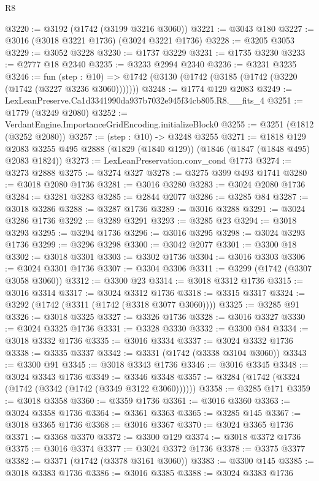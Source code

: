 \begin{lexlean}{R8}
\begin{coremodule}
@3220 := @3192 (@1742 (@3199 @3216 @3060))
@3221 := @3043 @180
@3227 := @3016 (@3018 @3221 @1736) (@3024 @3221 @1736)
@3228 := @3205 @3053
@3229 := @3052 @3228
@3230 := @1737 @3229
@3231 := @1735 @3230
@3233 := @2777 @18 @2340
@3235 := @3233 @2994 @2340
@3236 := @3231 @3235
@3246 := fun (step : @10) =>
  @1742 (@3130 (@1742 (@3185 (@1742 (@3220 (@1742 (@3227 @3236 @3060)))))))
@3248 := @1774 @129 @2083
@3249 := LexLeanPreserve.Ca1d3341990da937b7032e945f34cb805.R8.__fits_4
@3251 := @1779 (@3249 @2080)
@3252 := VerdantEngine.ImportanceGridEncoding.initializeBlock0
@3255 := @3251 (@1812 (@3252 @2080))
@3257 := (step : @10) -> @3248 @3255
@3271 := @1818
    @129
    @2083
    @3255
    @495
    @2888
    (@1829 (@1840 @129))
    (@1846 (@1847 (@1848 @495) @2083 @1824))
@3273 := LexLeanPreservation.conv_cond @1773
@3274 := @3273 @2888
@3275 := @3274 @327
@3278 := @3275 @399 @493 @1741
@3280 := @3018 @2080 @1736
@3281 := @3016 @3280
@3283 := @3024 @2080 @1736
@3284 := @3281 @3283
@3285 := @2844 @2077
@3286 := @3285 @84
@3287 := @3018 @3286
@3288 := @3287 @1736
@3289 := @3016 @3288
@3291 := @3024 @3286 @1736
@3292 := @3289 @3291
@3293 := @3285 @23
@3294 := @3018 @3293
@3295 := @3294 @1736
@3296 := @3016 @3295
@3298 := @3024 @3293 @1736
@3299 := @3296 @3298
@3300 := @3042 @2077
@3301 := @3300 @18
@3302 := @3018 @3301
@3303 := @3302 @1736
@3304 := @3016 @3303
@3306 := @3024 @3301 @1736
@3307 := @3304 @3306
@3311 := @3299 (@1742 (@3307 @3058 @3060))
@3312 := @3300 @23
@3314 := @3018 @3312 @1736
@3315 := @3016 @3314
@3317 := @3024 @3312 @1736
@3318 := @3315 @3317
@3324 := @3292 (@1742 (@3311 (@1742 (@3318 @3077 @3060))))
@3325 := @3285 @91
@3326 := @3018 @3325
@3327 := @3326 @1736
@3328 := @3016 @3327
@3330 := @3024 @3325 @1736
@3331 := @3328 @3330
@3332 := @3300 @84
@3334 := @3018 @3332 @1736
@3335 := @3016 @3334
@3337 := @3024 @3332 @1736
@3338 := @3335 @3337
@3342 := @3331 (@1742 (@3338 @3104 @3060))
@3343 := @3300 @91
@3345 := @3018 @3343 @1736
@3346 := @3016 @3345
@3348 := @3024 @3343 @1736
@3349 := @3346 @3348
@3357 := @3284 (@1742 (@3324 (@1742 (@3342 (@1742 (@3349 @3122 @3060))))))
@3358 := @3285 @171
@3359 := @3018 @3358
@3360 := @3359 @1736
@3361 := @3016 @3360
@3363 := @3024 @3358 @1736
@3364 := @3361 @3363
@3365 := @3285 @145
@3367 := @3018 @3365 @1736
@3368 := @3016 @3367
@3370 := @3024 @3365 @1736
@3371 := @3368 @3370
@3372 := @3300 @129
@3374 := @3018 @3372 @1736
@3375 := @3016 @3374
@3377 := @3024 @3372 @1736
@3378 := @3375 @3377
@3382 := @3371 (@1742 (@3378 @3161 @3060))
@3383 := @3300 @145
@3385 := @3018 @3383 @1736
@3386 := @3016 @3385
@3388 := @3024 @3383 @1736

\end{coremodule}
\end{lexlean}
